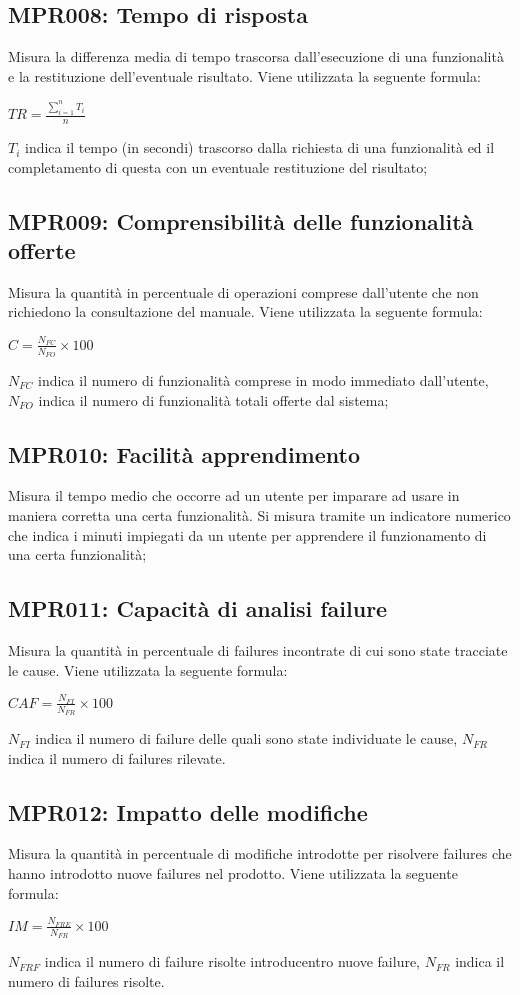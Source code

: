 \subsection{MPR008: Tempo di risposta}
Misura la differenza media di tempo trascorsa dall’esecuzione di una funzionalità e la restituzione
dell’eventuale risultato. Viene utilizzata la seguente formula:
\begin{center}{$TR=\frac{\sum\limits_{i=1}^n {T_i }}{n}$}\end{center}
${T_i}$ indica il tempo (in secondi) trascorso dalla richiesta di una funzionalità ed il completamento di questa con un eventuale restituzione del risultato;\\

\subsection{MPR009: Comprensibilità  delle funzionalità offerte}
Misura la quantità in percentuale di operazioni comprese dall’utente che non richiedono la
consultazione del manuale. Viene utilizzata la seguente formula:
\begin{center}{$C=\frac{N_{FC}}{N_{FO}}\times 100$}\end{center}
${N_{FC}}$ indica il numero di funzionalità comprese in modo immediato dall'utente, ${N_{FO}}$ indica il numero di funzionalità totali offerte dal sistema;
	
\subsection{MPR010: Facilità apprendimento}
Misura il tempo medio che occorre ad un utente per imparare ad usare in maniera corretta
una certa funzionalità. Si misura tramite un indicatore numerico che indica i minuti
impiegati da un utente per apprendere il funzionamento di una certa funzionalità;

\subsection{MPR011: Capacità di analisi failure}
Misura la quantità in percentuale di failures incontrate di cui sono state tracciate le cause. Viene
utilizzata la seguente formula:
\begin{center}{$CAF=\frac{N_{FI}}{N_{FR}}\times 100 $}\end{center}
${N_{FI}}$ indica il numero di failure delle quali sono state individuate le cause, ${N_{FR}}$ indica il numero di failures rilevate.

\subsection{MPR012: Impatto delle modifiche}
Misura la quantità in percentuale di modifiche introdotte per risolvere failures che hanno introdotto nuove failures nel prodotto. Viene utilizzata la seguente formula:
\begin{center}{$IM=\frac{N_{FRE}}{N_{FR}}\times 100 $}\end{center}
${N_{FRF}}$ indica il numero di failure risolte introducentro nuove failure, ${N_{FR}}$ indica il numero di failures risolte.


